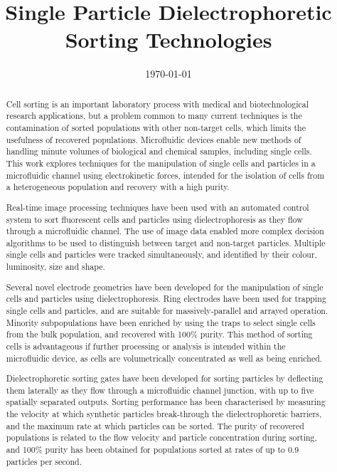 \documentclass[oneside]{ecsthesis}      %
\begin{document}
\frontmatter
\title      {Single Particle Dielectrophoretic Sorting Technologies}
\addresses  {\groupname\\\deptname\\\univname}
\date       {\today}
\subject    {}
\keywords   {}
\maketitle
\begin{abstract}
Cell sorting is an important laboratory process with medical and biotechnological research applications, but a problem common to many current techniques is the contamination of sorted populations with other non-target cells, which limits the usefulness of recovered populations. Microfluidic devices enable new methods of handling minute volumes of biological and chemical samples, including single cells. This work explores techniques for the manipulation of single cells and particles in a microfluidic channel using electrokinetic forces, intended for the isolation of cells from a heterogeneous population and recovery with a high purity. 

Real-time image processing techniques have been used with an automated control system to sort fluorescent cells and particles using dielectrophoresis as they flow through a microfluidic channel. The use of image data enabled more complex decision algorithms to be used to distinguish between target and non-target particles. Multiple single cells and particles were tracked simultaneously, and identified by their colour, luminosity, size and shape. 

Several novel electrode geometries have been developed for the manipulation of single cells and particles using dielectrophoresis. Ring electrodes have been used for trapping single cells and particles, and are suitable for massively-parallel and arrayed operation. Minority subpopulations have been enriched by using the traps to select single cells from the bulk population, and recovered with 100\% purity. This method of sorting cells is advantageous if further processing or analysis is intended within the microfluidic device, as cells are volumetrically concentrated as well as being enriched.

Dielectrophoretic sorting gates have been developed for sorting particles by deflecting them laterally as they flow through a microfluidic channel junction, with up to five spatially separated outputs. Sorting performance has been characterised by measuring the velocity at which synthetic particles break-through the dielectrophoretic barriers, and the maximum rate at which particles can be sorted. The purity of recovered populations is related to the flow velocity and particle concentration during sorting, and 100\% purity has been obtained for populations sorted at rates of up to 0.9 particles per second. 
\end{abstract}
\end{document}
